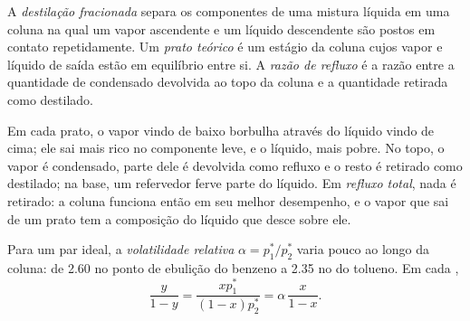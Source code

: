 \begin{definition}\label{def:b2:liquid-vapour-diagrams:fractional-distillation}
A \emph{destilação fracionada} separa os
componentes de uma mistura líquida em uma coluna na qual um vapor ascendente
e um líquido descendente são postos em contato repetidamente. Um \emph{prato
teórico} é um estágio da coluna cujos vapor e líquido de saída
estão em equilíbrio entre si. A \emph{razão de
refluxo} é a razão entre a quantidade de condensado
devolvida ao topo da coluna e a quantidade retirada como destilado.
\end{definition}

Em cada prato, o vapor vindo de baixo borbulha através do líquido vindo de
cima; ele sai mais rico no componente leve, e o líquido, mais pobre. No topo,
o vapor é condensado, parte dele é devolvida como refluxo e o resto é retirado
como destilado; na base, um refervedor ferve parte do líquido. Em
\textit{refluxo total}, nada é retirado: a coluna funciona então em seu
melhor desempenho, e o vapor que sai de um prato tem a composição do líquido
que desce sobre ele.


Para um par ideal, a \textit{volatilidade relativa} $\alpha = p_1^*/p_2^*$
varia pouco ao longo da coluna: de 2.60 no ponto de ebulição do benzeno a
2.35 no do tolueno. Em cada ,
\[
  \frac{y}{1 - y} = \frac{xp_1^*}{(1 - x)p_2^*} = \alpha\,\frac{x}{1 - x} .
\]


